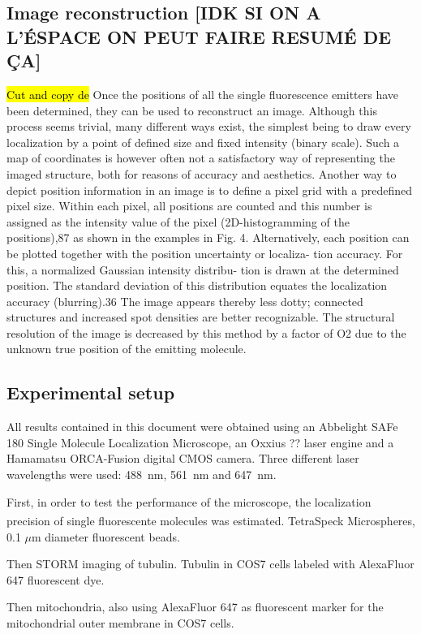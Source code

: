 \subsection{Image reconstruction [IDK SI ON A L'ÉSPACE ON PEUT FAIRE RESUMÉ DE ÇA]}
\hl{Cut and copy de }\cite{furstenberg_single-molecule_2013}
Once the positions of all the single fluorescence emitters have
been determined, they can be used to reconstruct an image.
Although this process seems trivial, many diﬀerent ways exist,
the simplest being to draw every localization by a point of defined
size and fixed intensity (binary scale). Such a map of coordinates
is however often not a satisfactory way of representing the imaged
structure, both for reasons of accuracy and aesthetics.
Another way to depict position information in an image is to
define a pixel grid with a predefined pixel size. Within each pixel,
all positions are counted and this number is assigned as the
intensity value of the pixel (2D-histogramming of the positions),87
as shown in the examples in Fig. 4. Alternatively, each position
can be plotted together with the position uncertainty or localiza-
tion accuracy. For this, a normalized Gaussian intensity distribu-
tion is drawn at the determined position. The standard deviation
of this distribution equates the localization accuracy (blurring).36
The image appears thereby less dotty; connected structures and
increased spot densities are better recognizable. The structural
resolution of the image is decreased by this method by a factor of
O2 due to the unknown true position of the emitting molecule.

\subsection{Experimental setup}
All results contained in this document were obtained using an Abbelight SAFe 180 Single Molecule Localization Microscope, an Oxxius ?? laser engine and a Hamamatsu ORCA-Fusion digital CMOS camera.
Three different laser wavelengths were used: \mbox{488 nm}, \mbox{561 nm} and \mbox{647 nm}.

First, in order to test the performance of the microscope, the localization precision of single fluorescente molecules was estimated.
TetraSpeck\textsuperscript{\texttrademark} Microspheres, 0.1 $\mu$m diameter fluorescent beads.

Then STORM imaging of tubulin. Tubulin in COS7 cells labeled with AlexaFluor 647 fluorescent dye.

Then mitochondria, also using AlexaFluor 647 as fluorescent marker for the mitochondrial outer membrane in COS7 cells.

